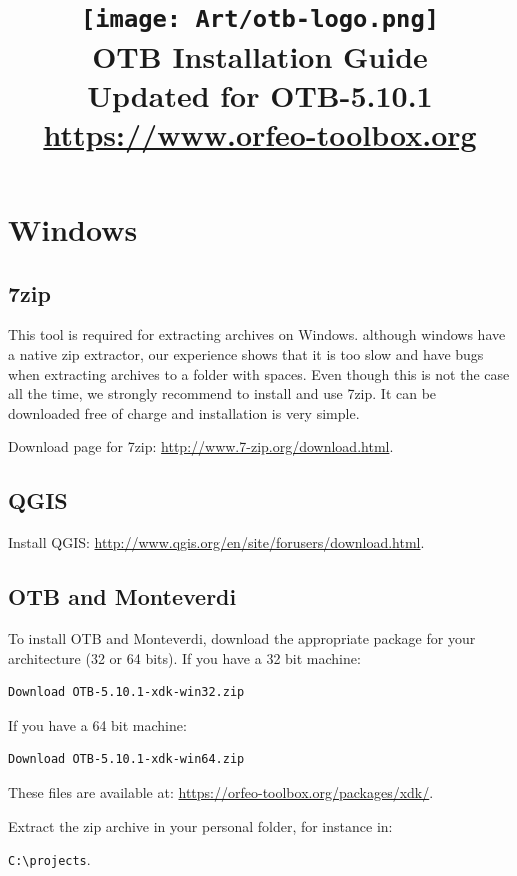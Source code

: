 \documentclass[10pt,a4paper]{article}
\title{\texttt{[image: Art/otb-logo.png]}\\
  OTB Installation Guide\\
  Updated for OTB-5.10.1\\
  {\small\url{https://www.orfeo-toolbox.org}}
}
\begin{document}
\maketitle

\tableofcontents

\clearpage

\section{Windows}

\subsection{7zip}
This tool is required for extracting archives on Windows. although windows have a native
zip extractor, our experience shows that it is too slow and have bugs when extracting
archives to a folder with spaces. Even though this is not the case all the time, we strongly
recommend to install and use 7zip. It can be downloaded free of charge and installation is very simple.

Download page for 7zip: \url{http://www.7-zip.org/download.html}.

\subsection{QGIS}
Install QGIS: \url{http://www.qgis.org/en/site/forusers/download.html}.

\subsection{OTB and Monteverdi}

To install OTB and Monteverdi, download the appropriate package for your
architecture (32 or 64 bits). If you have a 32 bit machine:

\begin{verbatim}
Download OTB-5.10.1-xdk-win32.zip
\end{verbatim}

If you have a 64 bit machine:

\begin{verbatim}
Download OTB-5.10.1-xdk-win64.zip
\end{verbatim}

These files are available at:
\url{https://orfeo-toolbox.org/packages/xdk/}.

Extract the zip archive in your personal folder, for instance in:\\
\begin{centering}
\texttt{C:{\textbackslash}projects}.
\end{centering}
\end{document}
